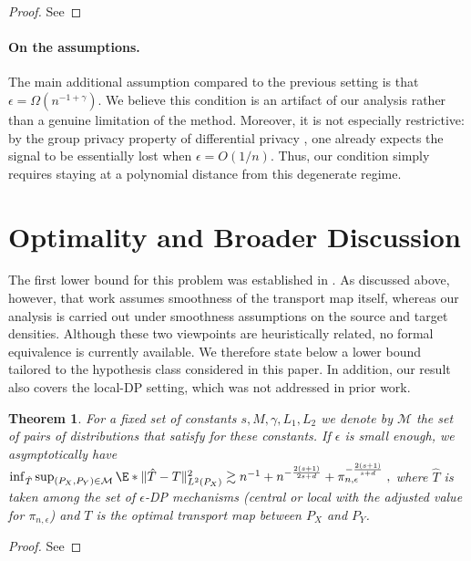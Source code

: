 \documentclass{article}
\newcommand{\1}{\mathds{1}}
\theoremstyle{plain}
\newtheorem{theorem}{Theorem}[section]
\theoremstyle{definition}
\theoremstyle{remark}
\begin{document}
\begin{proof}
    See 
\end{proof}

\paragraph{On the assumptions.}
The main additional assumption compared to the previous setting is that $\epsilon = \Omega(n^{-1+\gamma})$. We believe this condition is an artifact of our analysis rather than a genuine limitation of the method. Moreover, it is not especially restrictive: by the group privacy property of differential privacy \cite{dwork2014algorithmic}, one already expects the signal to be essentially lost when $\epsilon = O(1/n)$. Thus, our condition simply requires staying at a polynomial distance from this degenerate regime.


\section{Optimality and Broader Discussion}
\label{sec:discussion}

The first lower bound for this problem was established in \cite{lalanne2025PrivateOTMaps}. As discussed above, however, that work assumes smoothness of the transport map itself, whereas our analysis is carried out under smoothness assumptions on the source and target densities. Although these two viewpoints are heuristically related, no formal equivalence is currently available. We therefore state below a lower bound tailored to the hypothesis class considered in this paper. In addition, our result also covers the local-DP setting, which was not addressed in prior work.

\begin{theorem}
    \label{th:lower_bound} For a fixed set of constants $s, M, \gamma, L_1, L_2$
     we denote by $\mathcal{M}$ the set of pairs of distributions that satisfy  for these constants. If $\epsilon$ is small enough, we asymptotically have
     $
           \inf_{\hat{T}} \sup_{(P_X, P_Y) \in \mathcal{M}}  \E*{\| \hat{T} - T \|_{L^2(P_X)}^2}    
       \gtrsim   n^{-1} + n^{- \frac{2 (s+1)}{2 s + d}} + \pi_{n, \epsilon}^{- \frac{2 (s+1)}{ s + d}} \;,
     $
     where $\hat{T}$ is taken among the set of $\epsilon$-DP mechanisms (central or local with the adjusted value for $\pi_{n, \epsilon}$) and $T$ is the optimal transport map between $P_X$ and $P_Y$. 
\end{theorem}
\begin{proof}
    See 
\end{proof}
\end{document}
